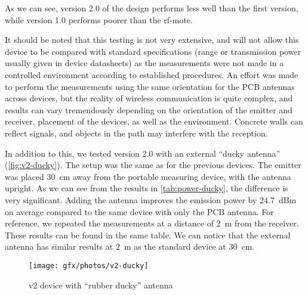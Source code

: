 \bigskip
As we can see, version 2.0 of the design performs less well than the first
version, while version 1.0 performs poorer than the rf-mote.

It should be noted that this testing is not very extensive, and will not allow
this device to be compared with standard specifications (range or transmission
power usually given in device datasheets) as the measurements were not made in
a controlled environment according to established procedures. An effort was made
to perform the measurements using the same orientation for the PCB antennas
across devices, but the reality of wireless communication is quite complex, and
results can vary tremendously depending on the orientation of the emitter and
receiver, placement of the devices, as well as the environment. Concrete walls
can reflect signals, and objects in the path may interfere with the reception.

In addition to this, we tested version 2.0 with an external ``ducky antenna''
(\autoref{fig:v2-ducky}). The setup was the same as for the previous devices.
The emitter was placed \SI{30}{cm} away from the portable measuring device, with
the antenna upright. As we can see from the results in
\autoref{tab:power-ducky}, the difference is very significant. Adding the
antenna improves the emission power by \SI{24.7}{dBm} on average compared to the
same device with only the PCB antenna.
For reference, we repeated the measurements at a distance of \SI{2}{m} from the
receiver. These results can be found in the same table. We can notice that the
external antenna has similar results at \SI{2}{m} as the standard device at
\SI{30}{cm}.

\begin{figure}[bth]
  \begin{center}
    \texttt{[image: gfx/photos/v2-ducky]}
  \end{center}
  \caption{v2 device with ``rubber ducky'' antenna}
  \label{fig:v2-ducky}
\end{figure}


